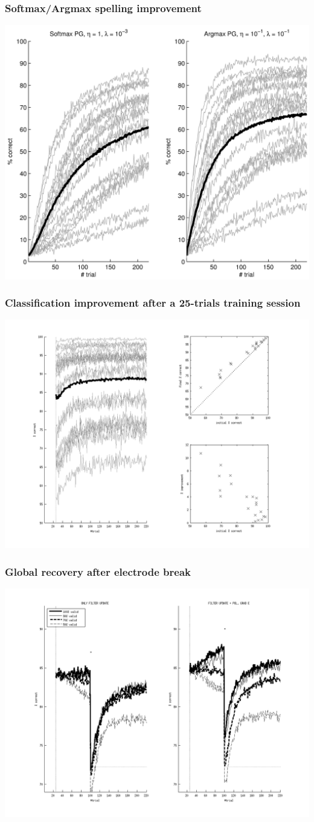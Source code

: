 \documentclass{beamer}
\begin{document}
\begin{frame}\frametitle{Softmax/Argmax spelling improvement}
\centerline{\includegraphics[width=0.7\linewidth]{PG_softmax.png}}
\end{frame}

\begin{frame}\frametitle{Classification improvement after a 25-trials training session}
\centerline{
	\includegraphics[width=0.7\linewidth]{fig_filter_adapt}
}
\end{frame}

\begin{frame}\frametitle{Global recovery after electrode break
		}
	\centerline{
		\includegraphics[width=0.7\linewidth]{fig_invalid}
	}
\end{frame}
\end{document}
